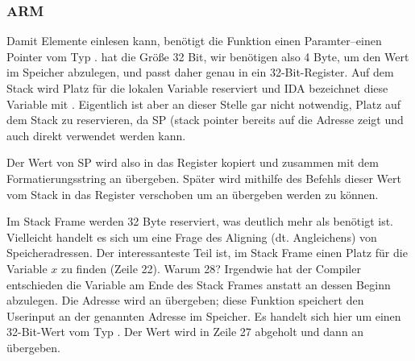 \subsubsection{ARM}

\myparagraph{\OptimizingKeilVI (\ThumbMode)}



\myindex{\CLanguageElements!\Pointers}
Damit \scanf Elemente einlesen kann, benötigt die Funktion einen Paramter--einen Pointer vom Typ \Tint.
\Tint hat die Größe 32 Bit, wir benötigen also 4 Byte, um den Wert im Speicher abzulegen, und passt daher genau in ein 32-Bit-Register.
Auf dem Stack wird Platz für die lokalen Variable  reserviert und IDA bezeichnet diese Variable mit . 
Eigentlich ist aber an dieser Stelle gar nicht notwendig, Platz auf dem Stack zu reservieren, da \ac{SP} (\gls{stack pointer} 
bereits auf die Adresse zeigt und auch direkt verwendet werden kann.

Der Wert von \ac{SP} wird also in das  Register kopiert und zusammen mit dem Formatierungsstring an \scanf übergeben.
Später wird mithilfe des  Befehls dieser Wert vom Stack in das  Register verschoben um an \printf übergeben werden zu können.




Im Stack Frame werden 32 Byte reserviert, was deutlich mehr als benötigt ist. Vielleicht handelt es sich um eine Frage des Aligning (dt. Angleichens) von Speicheradressen.
Der interessanteste Teil ist, im Stack Frame einen Platz für die Variable $x$ zu finden (Zeile 22).
Warum 28? Irgendwie hat der Compiler entschieden die Variable am Ende des Stack Frames anstatt an dessen Beginn abzulegen.
Die Adresse wird an \scanf übergeben; diese Funktion speichert den Userinput an der genannten Adresse im Speicher.
Es handelt sich hier um einen 32-Bit-Wert vom Typ \Tint. 
Der Wert wird in Zeile 27 abgeholt und dann an \printf übergeben.


